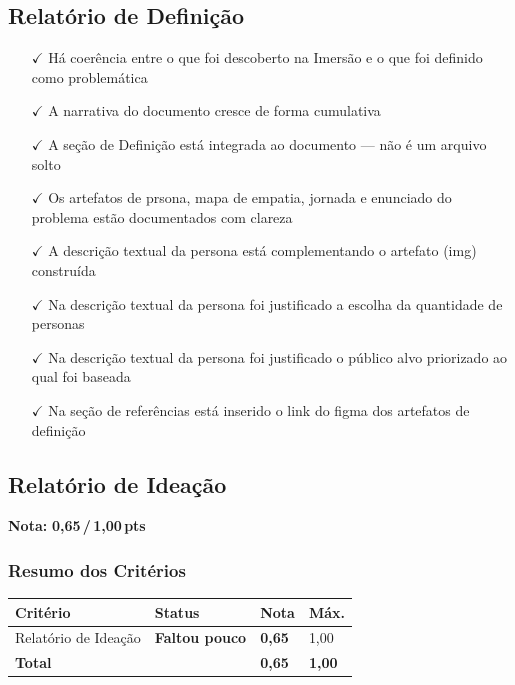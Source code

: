 \documentclass[
  sigconf,
  nonacm, %
  language=portuguese
]{acmart}
\newcommand{\notadestaque}[2]{%
  \noindent\textbf{Nota:}\enspace%
  {\large\bfseries\color{cred}#1\,/\,#2\,pts}%
}
\newcommand{\statusok}[1]{{\small\bfseries\color{cgood}#1}}
\newcommand{\statuswarn}[1]{{\small\bfseries\color{cwarn}#1}}
\begin{document}
\subsection{Relatório de Definição}

\noindent\statusok{1,00\,/\,1,00 pts · Completo}

\begin{itemize}[leftmargin=14pt,itemsep=1pt,topsep=3pt,parsep=0pt]
  \item[\textcolor{cgood}{$\checkmark$}] {\small\textcolor{cgood}{Há coerência entre o que foi descoberto na Imersão e o que foi definido como problemática}}
  \item[\textcolor{cgood}{$\checkmark$}] {\small\textcolor{cgood}{A narrativa do documento cresce de forma cumulativa}}
  \item[\textcolor{cgood}{$\checkmark$}] {\small\textcolor{cgood}{A seção de Definição está integrada ao documento — não é um arquivo solto}}
  \item[\textcolor{cgood}{$\checkmark$}] {\small\textcolor{cgood}{Os artefatos de prsona, mapa de empatia, jornada e enunciado do problema estão documentados com clareza}}
  \item[\textcolor{cgood}{$\checkmark$}] {\small\textcolor{cgood}{A descrição textual da persona está complementando o artefato (img) construída}}
  \item[\textcolor{cgood}{$\checkmark$}] {\small\textcolor{cgood}{Na descrição textual da persona foi justificado a escolha da quantidade de personas}}
  \item[\textcolor{cgood}{$\checkmark$}] {\small\textcolor{cgood}{Na descrição textual da persona foi justificado o público alvo priorizado ao qual foi baseada}}
  \item[\textcolor{cgood}{$\checkmark$}] {\small\textcolor{cgood}{Na seção de referências está inserido o link do figma dos artefatos de definição}}
\end{itemize}

\subsection{Relatório de Ideação}

\notadestaque{0,65}{1,00}

\subsubsection*{Resumo dos Critérios}

\begin{tabular}{@{} L{2.6cm} C{2.5cm} C{1.1cm} C{1.1cm} @{}}
\toprule
\textbf{Critério} & \textbf{Status} & \textbf{Nota} & \textbf{Máx.} \\
\midrule
Relatório de Ideação & \statuswarn{Faltou pouco} & \textbf{0,65} & 1,00 \\
\midrule
\textbf{Total} & & \textbf{\color{cred}0,65} & \textbf{1,00} \\
\bottomrule
\end{tabular}
\end{document}
